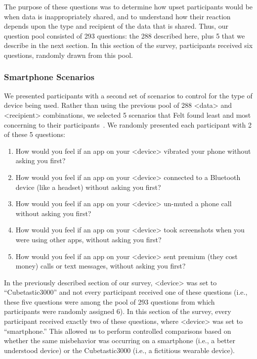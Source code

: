 The purpose of these questions was to determine how upset participants would be when data is inappropriately shared, and to understand how their reaction depends upon the type and recipient of the data that is shared. Thus, our question pool consisted of 293 questions: the 288 described here, plus 5 that we describe in the next section. In this section of the survey, participants received six questions, randomly drawn from this pool.

\subsubsection{Smartphone Scenarios}
\label{sec:smartphones}
We presented participants with a second set of scenarios to control for the type of device being used. Rather than using the previous pool of 288 <data> and <recipient> combinations, we selected 5 scenarios that Felt \etal found least and most concerning to their participants~\cite{Felt}. We randomly presented each participant with 2 of these 5 questions: 
\begin{enumerate}[topsep=0pt,itemsep=-1ex,partopsep=1ex,parsep=1ex]
\item How would you feel if an app on your <device> vibrated your phone without asking you first?
\item How would you feel if an app on your <device> connected to a Bluetooth device (like a headset) without asking you first?
\item How would you feel if an app on your <device> un-muted a phone call without asking you first?
\item How would you feel if an app on your <device> took screenshots when you were using other apps, without asking you first?
\item How would you feel if an app on your <device> sent premium (they cost money) calls or text messages, without asking you first?
\end{enumerate}

In the previously described section of our survey, <device> was set to ``Cubetastic3000'' and not every participant received one of these questions (i.e., these five questions were among the pool of 293 questions from which participants were randomly assigned 6). In this section of the survey, every participant received exactly two of these questions, where <device> was set to ``smartphone.'' This allowed us to perform controlled comparisons based on whether the same misbehavior was occurring on a smartphone (i.e., a better understood device) or the Cubetastic3000 (i.e., a fictitious wearable device).

